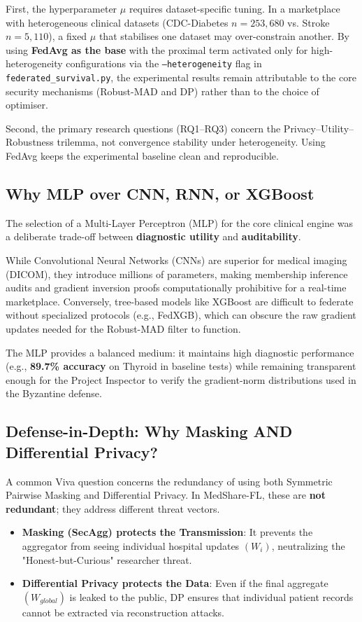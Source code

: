 \documentclass[10pt, a4paper, twocolumn]{article}
\begin{document}
First, the hyperparameter $\mu$ requires dataset-specific tuning. In a marketplace with heterogeneous clinical datasets (CDC-Diabetes $n=253,680$ vs. Stroke $n=5,110$), a fixed $\mu$ that stabilises one dataset may over-constrain another. By using \textbf{FedAvg as the base} with the proximal term activated only for high-heterogeneity configurations via the \texttt{--heterogeneity} flag in \texttt{federated\_survival.py}, the experimental results remain attributable to the core security mechanisms (Robust-MAD and DP) rather than to the choice of optimiser.

Second, the primary research questions (RQ1--RQ3) concern the Privacy--Utility--Robustness trilemma, not convergence stability under heterogeneity. Using FedAvg keeps the experimental baseline clean and reproducible.

\subsection{Why MLP over CNN, RNN, or XGBoost}
The selection of a Multi-Layer Perceptron (MLP) for the core clinical engine was a deliberate trade-off between \textbf{diagnostic utility} and \textbf{auditability}. 

While Convolutional Neural Networks (CNNs) are superior for medical imaging (DICOM), they introduce millions of parameters, making membership inference audits and gradient inversion proofs computationally prohibitive for a real-time marketplace. Conversely, tree-based models like XGBoost are difficult to federate without specialized protocols (e.g., FedXGB), which can obscure the raw gradient updates needed for the Robust-MAD filter to function. 

The MLP provides a balanced medium: it maintains high diagnostic performance (e.g., \textbf{89.7\% accuracy} on Thyroid in baseline tests) while remaining transparent enough for the Project Inspector to verify the gradient-norm distributions used in the Byzantine defense.

\subsection{Defense-in-Depth: Why Masking AND Differential Privacy?}
A common Viva question concerns the redundancy of using both Symmetric Pairwise Masking and Differential Privacy. In MedShare-FL, these are \textbf{not redundant}; they address different threat vectors.

\begin{itemize}
    \item \textbf{Masking (SecAgg) protects the Transmission}: It prevents the aggregator from seeing individual hospital updates $(W_i)$, neutralizing the "Honest-but-Curious" researcher threat.
    \item \textbf{Differential Privacy protects the Data}: Even if the final aggregate $(W_{global})$ is leaked to the public, DP ensures that individual patient records cannot be extracted via reconstruction attacks.
\end{itemize}
\end{document}
